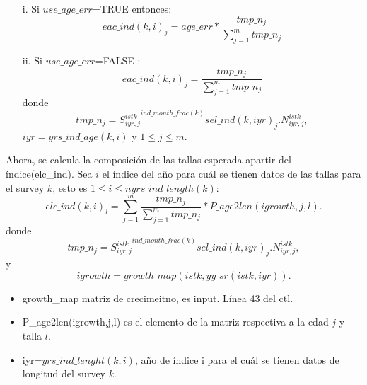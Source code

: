\documentclass{article}
\begin{document}
\begin{itemize}
        \item [i.] Si $use\_age\_err$=TRUE entonces: 
    \begin{equation}
        eac\_ind(k,i)_j=age\_err*\dfrac{tmp\_n_j}{\sum_{j=1}^mtmp\_n_j}
    \end{equation}
        \item [ii.] Si $use\_age\_err$=FALSE :
        \begin{equation}eac\_ind(k,i)_j=\dfrac{tmp\_n_j}{\sum_{j=1}^mtmp\_n_j}
    \end{equation}
donde \begin{equation}
    tmp\_n_j= {S^{istk}_{iyr,j}}^{ind\_month\_frac(k)}sel\_ind(k,iyr)_j.N^{istk}_{iyr,j},
\end{equation}
 $iyr=yrs\_ind\_age(k,i)$ y $1\leq j\leq m$.
    \end{itemize}

Ahora, se calcula la composición de las tallas esperada apartir del índice(elc\_ind). Sea $i$ el índice del año para cuál se tienen datos de las tallas para el survey $k$, esto es  $1\leq i \leq nyrs\_ind\_length(k)$:
\begin{equation}
    elc\_ind(k,i)_l=\sum_{j=1}^m\dfrac{tmp\_n_j}{\sum_{j=1}^mtmp\_n_j}*P\_age2len(igrowth,j,l).
\end{equation}
donde
\begin{equation}
    tmp\_n_j= {S^{istk}_{iyr,j}}^{ind\_month\_frac(k)}sel\_ind(k,iyr)_j.N^{istk}_{iyr,j},
\end{equation}
y
\begin{equation}
    igrowth=growth\_map(istk,yy\_sr(istk,iyr)).    
\end{equation}

\begin{itemize}
    \item growth\_map matriz de crecimeitno, es input. Línea 43 del ctl.
    \item P\_age2len(igrowth,j,l) es el elemento de la matriz respectiva a la edad $j$ y talla $l$.
    \item iyr=$yrs\_ind\_lenght(k,i)$, año de índice i para el cuál se tienen datos de longitud del survey $k$.
    \end{itemize}
    
\end{document}
